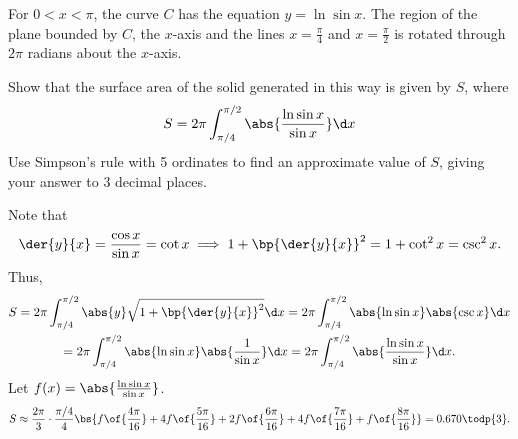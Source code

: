 \begin{problem}
    For $0 < x < \pi$, the curve $C$ has the equation $y = \ln \sin x$. The region of the plane bounded by $C$, the $x$-axis and the lines $x = \frac\pi4$ and $x = \frac\pi2$ is rotated through $2\pi$ radians about the $x$-axis.

    Show that the surface area of the solid generated in this way is given by $S$, where
    \[
        S = 2\pi \int_{\pi/4}^{\pi/2} \abs{\frac{\ln \sin x}{\sin x}} \d x
    \]
    Use Simpson's rule with 5 ordinates to find an approximate value of $S$, giving your answer to 3 decimal places.
\end{problem}
\begin{solution}
    Note that \[\der{y}{x} = \frac{\cos x}{\sin x} = \cot x \implies 1 + \bp{\der{y}{x}}^2 = 1 + \cot^2 x = \csc^2 x.\] Thus,
        \begin{gather*}
            S = 2\pi \int_{\pi/4}^{\pi/2} \abs{y} \sqrt{1 + \bp{\der{y}{x}}^2} \d x = 2\pi \int_{\pi/4}^{\pi/2} \abs{\ln \sin x} \abs{\csc x} \d x\\
            = 2\pi \int_{\pi/4}^{\pi/2} \abs{\ln \sin x} \abs{\frac1{\sin x}} \d x = 2\pi \int_{\pi/4}^{\pi/2} \abs{\frac{\ln \sin x}{\sin x}} \d x.
        \end{gather*}
        Let $f(x) = \abs{\frac{\ln \sin x}{\sin x}}$.
        \begin{gather*}
            S \approx \frac{2\pi}3 \cdot \frac{\pi/4}{4} \bs{f\of{\frac{4\pi}{16}} + 4f\of{\frac{5\pi}{16}} + 2f\of{\frac{6\pi}{16}} + 4f\of{\frac{7\pi}{16}} + f\of{\frac{8\pi}{16}}} = 0.670 \todp{3}.
        \end{gather*}
\end{solution}

